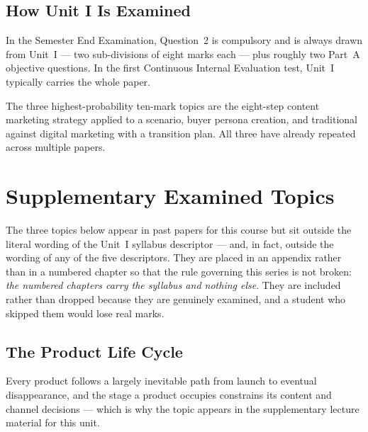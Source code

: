 \documentclass{MMTextbook}
\begin{document}
\begin{enumerate}[leftmargin=2.2em,itemsep=1.4ex]
\end{enumerate}

\section*{How Unit I Is Examined}

\begin{keybox}
In the Semester End Examination, Question~2 is compulsory and is always drawn
from Unit~I --- two sub-divisions of eight marks each --- plus roughly two Part~A
objective questions. In the first Continuous Internal Evaluation test, Unit~I
typically carries the whole paper.

\smallskip
The three highest-probability ten-mark topics are the eight-step content
marketing strategy applied to a scenario, buyer persona creation, and
traditional against digital marketing with a transition plan. All three have
already repeated across multiple papers.
\end{keybox}

\chapter{Supplementary Examined Topics}

\begin{warnbox}
The three topics below appear in past papers for this course but sit outside the
literal wording of the Unit~I syllabus descriptor --- and, in fact, outside the
wording of any of the five descriptors. They are placed in an appendix rather
than in a numbered chapter so that the rule governing this series is not broken:
\emph{the numbered chapters carry the syllabus and nothing else}. They are
included rather than dropped because they are genuinely examined, and a student
who skipped them would lose real marks.
\end{warnbox}

\section{The Product Life Cycle}

Every product follows a largely inevitable path from launch to eventual
disappearance, and the stage a product occupies constrains its content and
channel decisions --- which is why the topic appears in the supplementary
lecture material for this unit.
\end{document}

